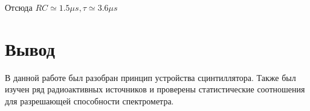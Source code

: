 \documentclass[a4paper,12pt]{article}
\begin{document}
	 Отсюда $RC\simeq1.5\mu s, \tau \simeq 3.6 \mu s$
	
	
	
	\section{Вывод}
	        
	 	В данной работе был разобран принцип устройства сцинтиллятора. Также был изучен ряд радиоактивных источников и проверены статистические соотношения для разрешающей способности спектрометра.       
	
\end{document}
